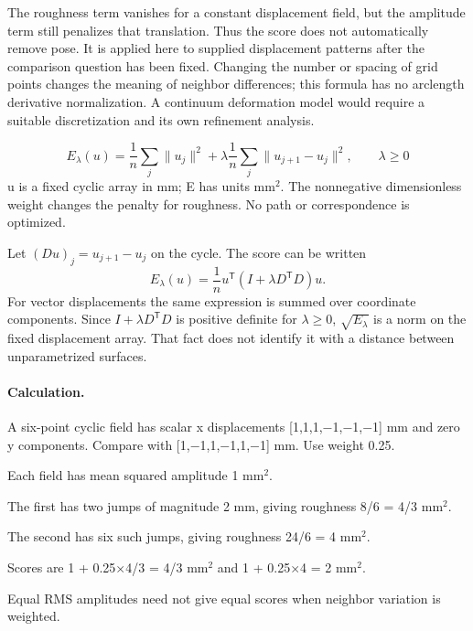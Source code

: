 \documentclass[11pt,letterpaper]{article}
\theoremstyle{definition}\newtheorem{definition}{Definition}\newtheorem{example}{Example}
\numberwithin{equation}{section}
\begin{document}
The roughness term vanishes for a constant displacement field, but the amplitude term still penalizes that translation. Thus the score does not automatically remove pose. It is applied here to supplied displacement patterns after the comparison question has been fixed. Changing the number or spacing of grid points changes the meaning of neighbor differences; this formula has no arclength derivative normalization. A continuum deformation model would require a suitable discretization and its own refinement analysis.

\[
E_\lambda(u)=\frac1n\sum_j\|u_j\|^2+\lambda\frac1n\sum_j\|u_{j+1}-u_j\|^2,\qquad\lambda\ge0
\]
u is a fixed cyclic array in mm; E has units mm\ensuremath{^{2}}. The nonnegative dimensionless weight changes the penalty for roughness. No path or correspondence is optimized.

Let $(Du)_j=u_{j+1}-u_j$ on the cycle. The score can be written
\[
 E_\lambda(u)=\frac1n u^{\mathsf T}(I+\lambda D^{\mathsf T}D)u.
\]
For vector displacements the same expression is summed over coordinate components. Since $I+\lambda D^{\mathsf T}D$ is positive definite for $\lambda\ge0$, $\sqrt{E_\lambda}$ is a norm on the fixed displacement array. That fact does not identify it with a distance between unparametrized surfaces.

\paragraph{Calculation.} A six-point cyclic field has scalar x displacements [1,1,1,\ensuremath{-}1,\ensuremath{-}1,\ensuremath{-}1] mm and zero y components. Compare with [1,\ensuremath{-}1,1,\ensuremath{-}1,1,\ensuremath{-}1] mm. Use weight 0.25.

Each field has mean squared amplitude 1 mm\ensuremath{^{2}}.

The first has two jumps of magnitude 2 mm, giving roughness 8/6 = 4/3 mm\ensuremath{^{2}}.

The second has six such jumps, giving roughness 24/6 = 4 mm\ensuremath{^{2}}.

Scores are 1 + 0.25\ensuremath{\times}4/3 = 4/3 mm\ensuremath{^{2}} and 1 + 0.25\ensuremath{\times}4 = 2 mm\ensuremath{^{2}}.

Equal RMS amplitudes need not give equal scores when neighbor variation is weighted.
\end{document}
